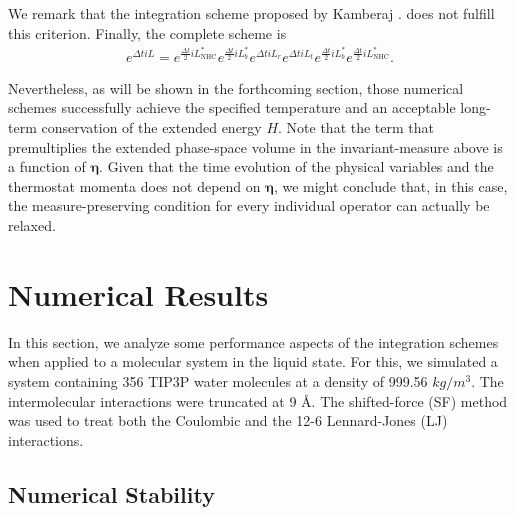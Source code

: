 \documentclass[aip,jcp,reprint,amsmath,amssymb]{revtex4-1}
\newcommand{\vt}[1]{\boldsymbol{\mathbf{#1}}}           %
\begin{document}
We remark that the integration scheme proposed by Kamberaj .\cite{Kamberaj2005} does not fulfill this criterion. 
Finally, the complete scheme is
\begin{equation}
\label{eq:modified_splitting}
\begin{split}
e^{\Delta t i\!L} = e^{\frac{\Delta t}{2} i\!L_\text{NHC}^\ast} e^{\frac{\Delta t}{2} i\!L_b^\ast} e^{\Delta t i\!L_r} e^{\Delta t i\!L_t}  e^{\frac{\Delta t}{2} i\!L_b^\ast} e^{\frac{\Delta t}{2} i\!L_\text{NHC}^\ast}.
\end{split}
\end{equation}

 Nevertheless, as will be shown in the forthcoming section, those numerical schemes successfully achieve the specified temperature and an acceptable long-term conservation of the extended energy $H$. Note that the term that premultiplies the extended phase-space volume in the invariant-measure above is a function of $\vt \eta$. Given that the time evolution of the physical variables and the thermostat momenta does not depend on $\vt \eta$, we might conclude that, in this case, the measure-preserving condition for every individual operator can actually be relaxed.



\section{Numerical Results}
\label{sec:numerical_results}

In this section, we analyze some performance aspects of the integration schemes when applied to a molecular system in the liquid state. For this, we simulated a system containing 356 TIP3P water molecules\cite{Price2004} at a density of 999.56 $kg/m^3$. The intermolecular interactions were truncated at 9 \AA. The shifted-force (SF) method\cite{Allen1989, Fennell2006, Toxvaerd_2011} was used to treat both the Coulombic and the 12-6 Lennard-Jones (LJ) interactions.

\subsection{Numerical Stability}
\label{sec:performance}
\end{document}
